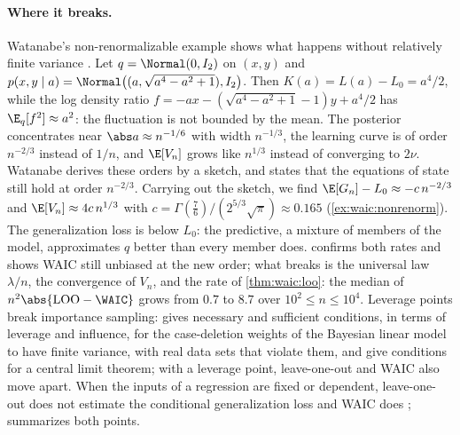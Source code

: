 \begin{refsection}
\paragraph{Where it breaks.} Watanabe's non-renormalizable example shows what happens without relatively finite variance \parencite[Section~5]{Watanabe2010d}. Let $q=\Normal(0,I_2)$ on $(x,y)$ and $p(x,y\mid a)=\Normal\bigl((a,\sqrt{a^4-a^2+1}),I_2\bigr)$. Then $K(a)=L(a)-L_0=a^4/2$, while the log density ratio $f=-ax-(\sqrt{a^4-a^2+1}-1)y+a^4/2$ has $\E_q[f^2]\approx a^2$: the fluctuation is not bounded by the mean. The posterior concentrates near $\abs a\approx n^{-1/6}$ with width $n^{-1/3}$, the learning curve is of order $n^{-2/3}$ instead of $1/n$, and $\E[V_n]$ grows like $n^{1/3}$ instead of converging to $2\nu$. Watanabe derives these orders by a sketch, and states that the equations of state still hold at order $n^{-2/3}$. Carrying out the sketch, we find $\E[G_n]-L_0\approx-c\,n^{-2/3}$ and $\E[V_n]\approx4c\,n^{1/3}$ with $c=\Gamma(\tfrac76)/(2^{5/3}\sqrt\pi)\approx0.165$ (\cref{ex:waic:nonrenorm}). The generalization loss is below $L_0$: the predictive, a mixture of members of the model, approximates $q$ better than every member does.  confirms both rates and shows WAIC still unbiased at the new order; what breaks is the universal law $\lambda/n$, the convergence of $V_n$, and the rate of \cref{thm:waic:loo}: the median of $n^2\abs{\waicLOO-\WAIC}$ grows from $0.7$ to $8.7$ over $10^2\le n\le10^4$. Leverage points break importance sampling: \textcite{Peruggia1997} gives necessary and sufficient conditions, in terms of leverage and influence, for the case-deletion weights of the Bayesian linear model to have finite variance, with real data sets that violate them, and \textcite{EpifaniEtAl2008} give conditions for a central limit theorem; with a leverage point, leave-one-out and WAIC also move apart. When the inputs of a regression are fixed or dependent, leave-one-out does not estimate the conditional generalization loss and WAIC does \parencite{Watanabe2018,Watanabe2021b}; \textcite{Watanabe2024} summarizes both points.


\end{refsection}
